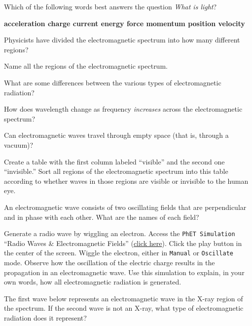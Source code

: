 \documentclass[../main-physics-problems.tex]{subfiles}
\begin{document}
\begin{questions}

\question
Which of the following words best answers the question \textit{What is light}?


\begin{center}
    \textbf{
    acceleration \hfill
    charge \hfill
    current \hfill
    energy \hfill
    force \hfill
    momentum \hfill
    position \hfill
    velocity \hfill
    }
\end{center}



\question
Physicists have divided the electromagnetic spectrum into how many different regions?


\question
Name all the regions of the electromagnetic spectrum.


\question
What are some differences between the various types of electromagnetic radiation?


\question
How does wavelength change as frequency \textit{increases} across the electromagnetic spectrum?


\question
Can electromagnetic waves travel through empty space (that is, through a vacuum)?


\question
Create a table with the first column labeled ``visible'' and the second one ``invisible.'' Sort all regions of the electromagnetic spectrum into this table according to whether waves in those regions are visible or invisible to the human eye.



\question
An electromagnetic wave consists of two oscillating fields that are perpendicular and in phase with each other. What are the names of each field?


\question
Generate a radio wave by wiggling an electron. Access the \texttt{PhET Simulation} ``Radio Waves \& Electromagnetic Fields'' (\href{https://phet.colorado.edu/en/simulations/radio-waves}{click here}). Click the play button in the center of the screen. Wiggle the electron, either in \texttt{Manual} or \texttt{Oscillate} mode. Observe how the oscillation of the electric charge results in the propagation in an electromagnetic wave. Use this simulation to explain, in your own words, how all electromagnetic radiation is generated.


\question
The first wave below represents an electromagnetic wave in the X-ray region of the spectrum. If the second wave is not an X-ray, what type of electromagnetic radiation does it represent?



\end{questions}
\end{document}
